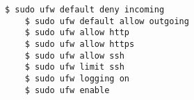 \begin{lstlisting}[language=term,catption=Konfiguration der UFW mit ad-hoc Kommandos,label=ad-hoc-config]
    $ sudo ufw default deny incoming
    $ sudo ufw default allow outgoing
    $ sudo ufw allow http
    $ sudo ufw allow https
    $ sudo ufw allow ssh
    $ sudo ufw limit ssh
    $ sudo ufw logging on
    $ sudo ufw enable
\end{lstlisting}